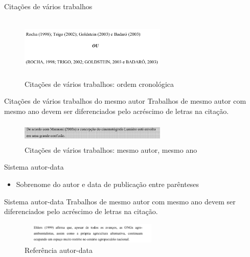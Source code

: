 \begin{frame}	
	\begin{block}{Citações de vários trabalhos}	
		 \begin{figure}[!htb]
			\centering	  				
			\includegraphics[height=3cm, width = 7cm]{./pic/cronologica.png}
			\caption{Citações de vários trabalhos: ordem cronológica}
			\author{Guia de formatação SENAC }
			\label{fig_citacaodecitacao}
		\end{figure}
	\end{block}
\end{frame}

\begin{frame}	
	\begin{block}{Citações de vários trabalhos do mesmo autor}	
	Trabalhos de mesmo autor com mesmo ano devem ser diferenciados pelo acréscimo de letras na citação.
		 \begin{figure}[!htb]
			\centering	  				
			\includegraphics[height=1cm, width = 7cm]{./pic/letra.png}
			\caption{Citações de vários trabalhos: mesmo autor, mesmo ano}
			\author{Guia de formatação SENAC }
			\label{fig_citacaodecitacao}
		\end{figure}
	\end{block}
\end{frame}

\begin{frame}	
	\begin{block}{Sistema autor-data}	
		\begin{itemize}
			\item Sobrenome do autor e data de publicação entre parênteses
		\end{itemize}
	\end{block}
\end{frame}

\begin{frame}	
	\begin{block}{Sistema autor-data}	
	Trabalhos de mesmo autor com mesmo ano devem ser diferenciados pelo acréscimo de letras na citação.
		 \begin{figure}[!htb]
			\centering	  				
			\includegraphics[height=1cm, width = 7cm]{./pic/autordata.png}
			\caption{Referência autor-data}
			\author{Guia de formatação SENAC }
			\label{fig_citacaodecitacao}
		\end{figure}
	\end{block}
\end{frame}

